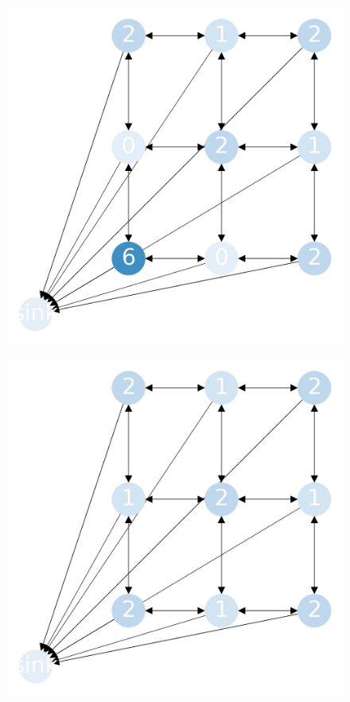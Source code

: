 \documentclass{beamer}
\begin{document}
    \begin{frame}
      \begin{figure}[h!]
        \centering
          \includegraphics[scale=0.25]{sandpile_-32}
      \end{figure}
    \end{frame}
    

    \begin{frame}
      \begin{figure}[h!]
        \centering
          \includegraphics[scale=0.25]{sandpile_-33}
      \end{figure}
    \end{frame}
    

    
\end{document}
